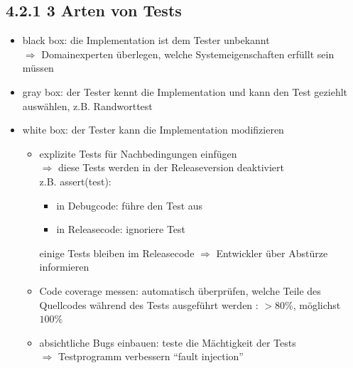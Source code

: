 \documentclass[11pt, fleqn]{scrreprt}
\begin{document}
\inputminted{python}{Programs/mysqrttest.py}

\subsection*{4.2.1 3 Arten von Tests}
\begin{itemize}
    \item black box: die Implementation ist dem Tester unbekannt\\
    $\Rightarrow$ Domainexperten überlegen, welche Systemeigenschaften erfüllt sein müssen
    \item gray box: der Tester kennt die Implementation und kann den Test geziehlt auswählen, z.B. Randworttest
    \item white box: der Tester kann die Implementation modifizieren
    \begin{itemize}
        \item explizite Tests für Nachbedingungen einfügen \\
        $\Rightarrow$ diese Tests werden in der Releaseversion deaktiviert \\
        z.B. assert(test):
        \begin{itemize}
            \item in Debugcode: führe den Test aus
            \item in Releasecode: ignoriere Test
        \end{itemize}
        einige Tests bleiben im Releasecode $\Rightarrow$ Entwickler über Abstürze informieren
        \item Code coverage messen: automatisch überprüfen, welche Teile des Quellcodes während des Tests ausgeführt werden : $> 80\% $, möglichst $100\%$
        \item absichtliche Bugs einbauen: teste die Mächtigkeit der Tests\\
        $\Rightarrow$ Testprogramm verbessern ``fault injection''
    \end{itemize}
\end{itemize}
\end{document}

